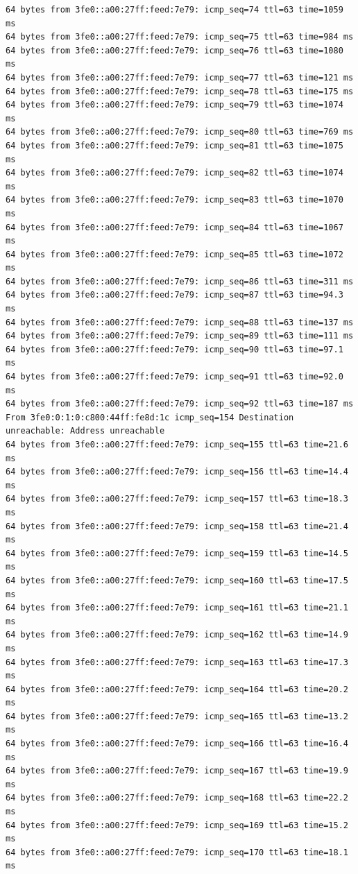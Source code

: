 \documentclass{article}
\begin{document}
\begin{Verbatim}
64 bytes from 3fe0::a00:27ff:feed:7e79: icmp_seq=74 ttl=63 time=1059 ms
64 bytes from 3fe0::a00:27ff:feed:7e79: icmp_seq=75 ttl=63 time=984 ms
64 bytes from 3fe0::a00:27ff:feed:7e79: icmp_seq=76 ttl=63 time=1080 ms
64 bytes from 3fe0::a00:27ff:feed:7e79: icmp_seq=77 ttl=63 time=121 ms
64 bytes from 3fe0::a00:27ff:feed:7e79: icmp_seq=78 ttl=63 time=175 ms
64 bytes from 3fe0::a00:27ff:feed:7e79: icmp_seq=79 ttl=63 time=1074 ms
64 bytes from 3fe0::a00:27ff:feed:7e79: icmp_seq=80 ttl=63 time=769 ms
64 bytes from 3fe0::a00:27ff:feed:7e79: icmp_seq=81 ttl=63 time=1075 ms
64 bytes from 3fe0::a00:27ff:feed:7e79: icmp_seq=82 ttl=63 time=1074 ms
64 bytes from 3fe0::a00:27ff:feed:7e79: icmp_seq=83 ttl=63 time=1070 ms
64 bytes from 3fe0::a00:27ff:feed:7e79: icmp_seq=84 ttl=63 time=1067 ms
64 bytes from 3fe0::a00:27ff:feed:7e79: icmp_seq=85 ttl=63 time=1072 ms
64 bytes from 3fe0::a00:27ff:feed:7e79: icmp_seq=86 ttl=63 time=311 ms
64 bytes from 3fe0::a00:27ff:feed:7e79: icmp_seq=87 ttl=63 time=94.3 ms
64 bytes from 3fe0::a00:27ff:feed:7e79: icmp_seq=88 ttl=63 time=137 ms
64 bytes from 3fe0::a00:27ff:feed:7e79: icmp_seq=89 ttl=63 time=111 ms
64 bytes from 3fe0::a00:27ff:feed:7e79: icmp_seq=90 ttl=63 time=97.1 ms
64 bytes from 3fe0::a00:27ff:feed:7e79: icmp_seq=91 ttl=63 time=92.0 ms
64 bytes from 3fe0::a00:27ff:feed:7e79: icmp_seq=92 ttl=63 time=187 ms
From 3fe0:0:1:0:c800:44ff:fe8d:1c icmp_seq=154 Destination unreachable: Address unreachable
64 bytes from 3fe0::a00:27ff:feed:7e79: icmp_seq=155 ttl=63 time=21.6 ms
64 bytes from 3fe0::a00:27ff:feed:7e79: icmp_seq=156 ttl=63 time=14.4 ms
64 bytes from 3fe0::a00:27ff:feed:7e79: icmp_seq=157 ttl=63 time=18.3 ms
64 bytes from 3fe0::a00:27ff:feed:7e79: icmp_seq=158 ttl=63 time=21.4 ms
64 bytes from 3fe0::a00:27ff:feed:7e79: icmp_seq=159 ttl=63 time=14.5 ms
64 bytes from 3fe0::a00:27ff:feed:7e79: icmp_seq=160 ttl=63 time=17.5 ms
64 bytes from 3fe0::a00:27ff:feed:7e79: icmp_seq=161 ttl=63 time=21.1 ms
64 bytes from 3fe0::a00:27ff:feed:7e79: icmp_seq=162 ttl=63 time=14.9 ms
64 bytes from 3fe0::a00:27ff:feed:7e79: icmp_seq=163 ttl=63 time=17.3 ms
64 bytes from 3fe0::a00:27ff:feed:7e79: icmp_seq=164 ttl=63 time=20.2 ms
64 bytes from 3fe0::a00:27ff:feed:7e79: icmp_seq=165 ttl=63 time=13.2 ms
64 bytes from 3fe0::a00:27ff:feed:7e79: icmp_seq=166 ttl=63 time=16.4 ms
64 bytes from 3fe0::a00:27ff:feed:7e79: icmp_seq=167 ttl=63 time=19.9 ms
64 bytes from 3fe0::a00:27ff:feed:7e79: icmp_seq=168 ttl=63 time=22.2 ms
64 bytes from 3fe0::a00:27ff:feed:7e79: icmp_seq=169 ttl=63 time=15.2 ms
64 bytes from 3fe0::a00:27ff:feed:7e79: icmp_seq=170 ttl=63 time=18.1 ms

\end{Verbatim}
\end{document}
